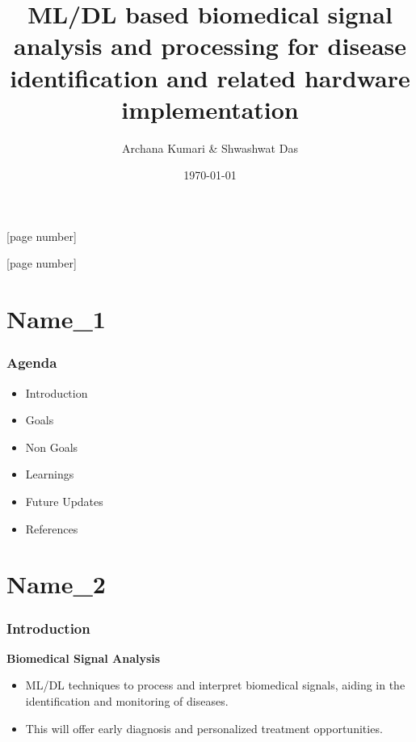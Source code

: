 \documentclass{beamer}
\title[Biomedical Signal Analysis]{ML/DL based biomedical signal analysis and processing for disease identification and related hardware implementation } %
\author[Archana Kumari \& Shwashwat Das]{Archana Kumari \& Shwashwat Das}
\institute[STUDENT ID] %
{

{\small Supervisor} \\
\medskip
{\small Prof. Sumitra Mukhopadhyay }\\
\vspace{0.5cm}
Institute of Radiophysics and Electronics\\
University of Calcutta

}
\date[\today]{\today}
\begin{document}
\begin{frame}
\titlepage %
[page number]

\end{frame}
[page number]



\section{Name\_1} 
\begin{frame}[allowframebreaks]
\frametitle{Agenda}
\begin{itemize}
\item {Introduction}
\vspace{0.15cm}
\item {Goals}
\vspace{0.15cm}
\item {Non Goals}
\vspace{0.15cm}
\item {Learnings}
\vspace{0.15cm}
\item {Future Updates}
\vspace{0.15cm}
\item {References}
\vspace{0.15cm}
\end{itemize}

\end{frame}



\section{Name\_2}
\begin{frame}[allowframebreaks]
\frametitle{Introduction}
\textbf{Biomedical Signal Analysis}
\vspace{0.3cm}
\begin{itemize}
\item {ML/DL techniques to process and interpret biomedical signals, aiding in the identification and monitoring of diseases.}
\vspace{0.15cm}
\item {This will offer early diagnosis and personalized treatment opportunities.}
\end{itemize}

\end{frame}
\end{document}
